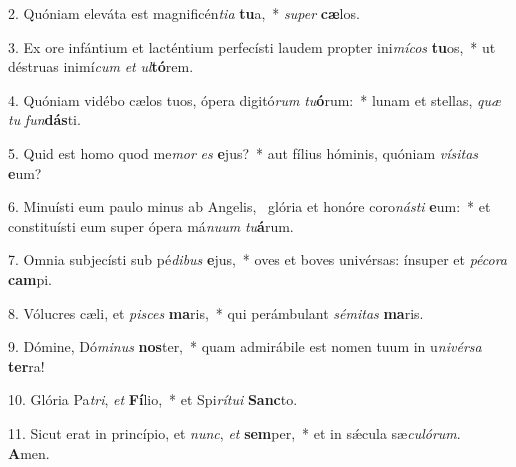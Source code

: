 2. Quóniam eleváta est magnificén\textit{ti}\textit{a} \textbf{tu}a,~*  \textit{su}\textit{per} \textbf{cæ}los.\

3. Ex ore infántium et lacténtium perfecísti laudem propter ini\textit{mí}\textit{cos} \textbf{tu}os,~*  ut déstruas inimí\textit{cum} \textit{et} \textit{ul}\textbf{tó}rem.\

4. Quóniam vidébo cælos tuos, ópera digitó\textit{rum} \textit{tu}\textbf{ó}rum:~*  lunam et stellas, \textit{quæ} \textit{tu} \textit{fun}\textbf{dás}ti.\

5. Quid est homo quod me\textit{mor} \textit{es} \textbf{e}jus?~*  aut fílius hóminis, quóniam \textit{ví}\textit{si}\textit{tas} \textbf{e}um?\

6. Minuísti eum paulo minus ab Angelis, \dag\  glória et honóre coro\textit{nás}\textit{ti} \textbf{e}um:~*  et constituísti eum super ópera má\textit{nu}\textit{um} \textit{tu}\textbf{á}rum.\

7. Omnia subjecísti sub pé\textit{di}\textit{bus} \textbf{e}jus,~*  oves et boves univérsas: ínsuper et \textit{pé}\textit{co}\textit{ra} \textbf{cam}pi.\

8. Vólucres cæli, et \textit{pi}\textit{sces} \textbf{ma}ris,~*  qui perámbulant \textit{sé}\textit{mi}\textit{tas} \textbf{ma}ris.\

9. Dómine, Dó\textit{mi}\textit{nus} \textbf{nos}ter,~*  quam admirábile est nomen tuum in u\textit{ni}\textit{vér}\textit{sa} \textbf{ter}ra!\

10. Glória Pa\textit{tri}, \textit{et} \textbf{Fí}lio,~*  et Spi\textit{rí}\textit{tu}\textit{i} \textbf{Sanc}to.\

11. Sicut erat in princípio, et \textit{nunc}, \textit{et} \textbf{sem}per,~*  et in sǽcula sæ\textit{cu}\textit{ló}\textit{rum}. \textbf{A}men.\

